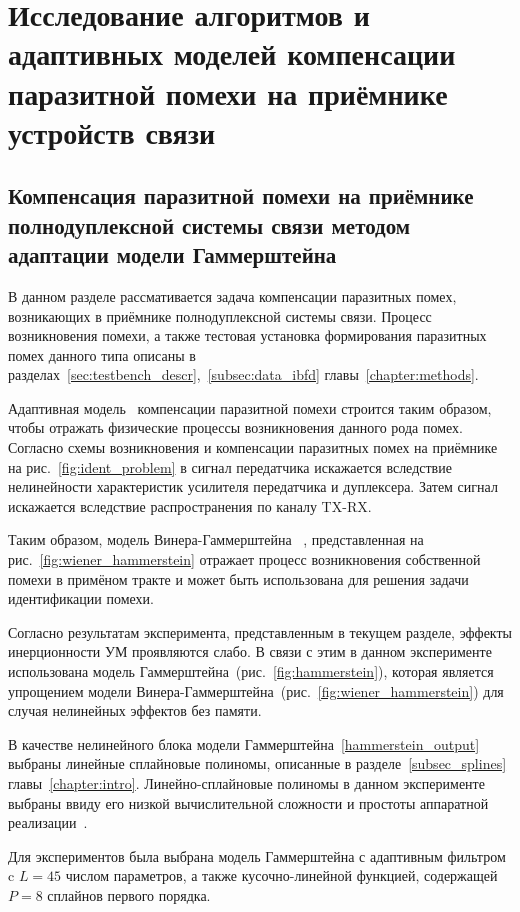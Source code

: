 \section{Исследование алгоритмов и адаптивных моделей компенсации паразитной помехи на приёмнике  устройств связи}

\subsection{Компенсация паразитной помехи на приёмнике полнодуплексной системы связи методом адаптации модели Гаммерштейна} \label{subsec:ibfd_hammerstein}

В данном разделе рассмативается задача компенсации паразитных помех, возникающих в приёмнике полнодуплексной системы связи. Процесс возникновения помехи, а также тестовая установка формирования паразитных помех данного типа описаны в разделах~\ref{sec:testbench_descr},~\ref{subsec:data_ibfd} главы~\ref{chapter:methods}.

Адаптивная модель~\cite{behav_model} компенсации паразитной помехи строится таким образом, чтобы отражать физические процессы возникновения данного рода помех. Согласно схемы возникновения и компенсации паразитных помех на приёмнике на рис.~\ref{fig:ident_problem} в сигнал передатчика искажается вследствие нелинейности характеристик усилителя передатчика и дуплексера. Затем сигнал искажается вследствие распространения по каналу TX-RX.

Таким образом, модель Винера-Гаммерштейна ~\cite{behav_model}, представленная на рис.~\ref{fig:wiener_hammerstein} отражает процесс возникновения собственной помехи в примёном тракте и может быть использована для решения задачи идентификации помехи. 

Согласно результатам эксперимента, представленным в текущем разделе, эффекты инерционности УМ проявляются слабо. В связи с этим в данном эксперименте использована модель Гаммерштейна~(рис.~\ref{fig:hammerstein}), которая является упрощением модели Винера-Гаммерштейна~(рис.~\ref{fig:wiener_hammerstein}) для случая нелинейных эффектов без памяти. 

В качестве нелинейного блока модели Гаммерштейна~\eqref{hammerstein_output} выбраны линейные сплайновые полиномы, описанные в разделе~\ref{subsec_splines} главы~\ref{chapter:intro}. Линейно-сплайновые полиномы в данном эксперименте выбраны ввиду его низкой вычислительной сложности и простоты аппаратной реализации~\cite{dpd_models, lut_dpd}.

Для экспериментов была выбрана модель Гаммерштейна с адаптивным фильтром c $L=45$ числом параметров, а также кусочно-линейной функцией, содержащей $P=8$ сплайнов первого порядка. 

